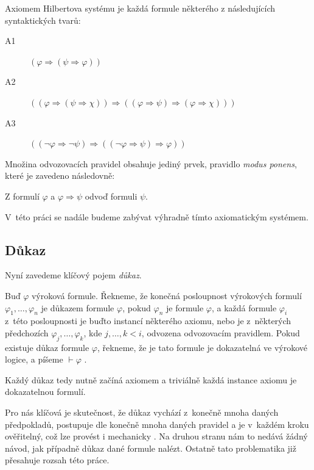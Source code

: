 \documentclass[thesis=B,czech,hidelinks]{thesis}[2012/06/26]
\begin{document}
Axiomem Hilbertova systému je každá formule některého z následujících syntaktických tvarů:

\begin{description}
	\item[A1] $( \varphi \Rightarrow ( \psi \Rightarrow \varphi ))$
	\item[A2] $(( \varphi \Rightarrow ( \psi \Rightarrow \chi )) \Rightarrow (( \varphi \Rightarrow \psi ) \Rightarrow ( \varphi \Rightarrow \chi )))$
	\item[A3] $(( \neg \varphi \Rightarrow \neg \psi ) \Rightarrow (( \neg \varphi \Rightarrow \psi ) \Rightarrow \varphi ))$
\end{description}

Množina odvozovacích pravidel obsahuje jediný prvek, pravidlo \emph{modus ponens}, které je zavedeno následovně:

\begin{dfn}
Z formulí $\varphi$ a $\varphi \Rightarrow \psi$ odvoď formuli $\psi$.
\end{dfn}

V~této práci se nadále budeme zabývat výhradně tímto axiomatickým systémem.

\subsection{Důkaz}

Nyní zavedeme klíčový pojem \emph{důkaz}.

\begin{dfn}
Buď $\varphi$ výroková formule. Řekneme, že konečná posloupnost výrokových formulí $\varphi_1 , \ldots, \varphi_n$ je důkazem formule $\varphi$, pokud $\varphi_n$ je formule $\varphi$, a každá formule $\varphi_i$ z~této posloupnosti je buďto instancí některého axiomu, nebo je z~některých předchozích $\varphi_j, \ldots , \varphi_k$, kde $j, \ldots , k < i$, odvozena odvozovacím pravidlem. Pokud existuje důkaz formule $\varphi$, řekneme, že je tato formule je dokazatelná ve výrokové logice, a píšeme $\vdash \varphi$ \cite{logika}.
\end{dfn}

Každý důkaz tedy nutně začíná axiomem a triviálně každá instance axiomu je dokazatelnou formulí.

Pro nás klíčová je skutečnost, že důkaz vychází z~konečně mnoha daných předpokladů, postupuje dle konečně mnoha daných pravidel a je v~každém kroku ověřitelný, což lze provést i mechanicky \cite{logika}. Na druhou stranu nám to nedává žádný návod, jak případně důkaz dané formule nalézt. Ostatně tato problematika již přesahuje rozsah této práce.
\end{document}
